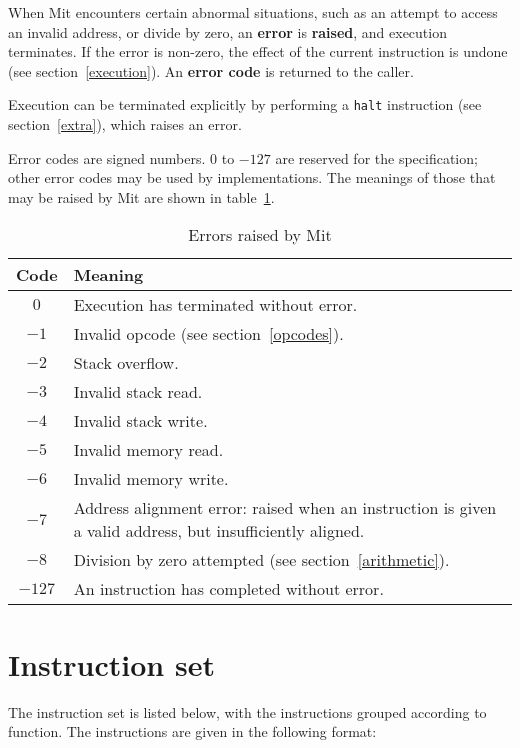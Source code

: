 \documentclass[a4paper]{article}
\begin{document}
When Mit encounters certain abnormal situations, such as an attempt to access an invalid address, or divide by zero, an {\bf error} is {\bf raised}, and execution terminates. If the error is non-zero, the effect of the current instruction is undone (see section~\ref{execution}). An {\bf error code} is returned to the caller.

Execution can be terminated explicitly by performing a {\tt halt} instruction (see section~\ref{extra}), which raises an error.

Error codes are signed numbers. $0$ to $-127$ are reserved for the specification; other error codes may be used by implementations. The meanings of those that may be raised by Mit are shown in table~\ref{errortable}.

\begin{table}[htbp]
\begin{center}
\begin{tabular}{cp{4in}} \toprule
\bf Code & \bf Meaning \\ \midrule
$0$ & Execution has terminated without error. \\
$-1$ & Invalid opcode (see section~\ref{opcodes}). \\
$-2$ & Stack overflow. \\
$-3$ & Invalid stack read. \\
$-4$ & Invalid stack write. \\
$-5$ & Invalid memory read. \\
$-6$ & Invalid memory write. \\
$-7$ & Address alignment error: raised when an instruction is given a valid address, but insufficiently aligned. \\
$-8$ & Division by zero attempted (see section~\ref{arithmetic}). \\
$-127$ & An instruction has completed without error. \\
 \bottomrule
\end{tabular}
\caption{\label{errortable}Errors raised by Mit}
\end{center}
\end{table}


\section{Instruction set}
\label{instset}

The instruction set is listed below,
with the instructions grouped according to function. The
instructions are given in the following format:
\end{document}
